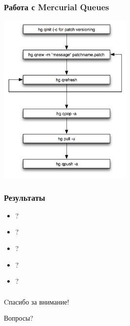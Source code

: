 \documentclass[unicode]{beamer}
\begin{document}
\begin{frame}
\transwipe[direction=90]
\frametitle{Работа с Mercurial Queues}
\centerline{\includegraphics[width=0.5\textwidth]{mq-workflow.png}}
\end{frame}

\begin{frame}
\transwipe[direction=90]
\frametitle{Результаты}
\begin{block}{}
\begin{itemize}
  \item ?
  \item ?
  \item ?
  \item ?
  \item ?
\end{itemize}
\end{block}
\end{frame}


\begin{frame}
\transwipe[direction=90]
\frametitle{}
\centerline{\large{Cпасибо за внимание!}}
\hspace{2cm}
\centerline{\huge{Вопросы?}}
\end{frame}
\end{document}
